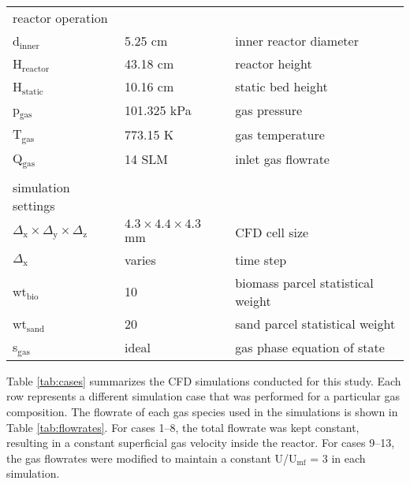 \begin{table}[H]
\begin{tabular}{lll}
        \\
        reactor operation \\
        d$_\text{inner}$      & 5.25 cm       & inner reactor diameter \\
        H$_\text{reactor}$    & 43.18 cm      & reactor height \\
        H$_\text{static}$     & 10.16 cm      & static bed height \\
        p$_\text{gas}$        & 101.325 kPa   & gas pressure \\
        T$_\text{gas}$        & 773.15 K      & gas temperature \\
        Q$_\text{gas}$        & 14 SLM        & inlet gas flowrate \\
        \\
        simulation settings \\
        $\Delta_\text{x} \times \Delta_\text{y} \times \Delta_\text{z}$ & $4.3 \times 4.4 \times 4.3$ mm & CFD cell size \\
        $\Delta_\text{x}$   & varies & time step \\
        wt$_\text{bio}$      & 10     & biomass parcel statistical weight \\
        wt$_\text{sand}$     & 20     & sand parcel statistical weight \\
        s$_\text{gas}$               & ideal  & gas phase equation of state \\
        \bottomrule
    \end{tabular}
\end{table}

Table \ref{tab:cases} summarizes the CFD simulations conducted for this study. Each row represents a different simulation case that was performed for a particular gas composition. The flowrate of each gas species used in the simulations is shown in Table \ref{tab:flowrates}. For cases 1--8, the total flowrate was kept constant, resulting in a constant superficial gas velocity inside the reactor. For cases 9--13, the gas flowrates were modified to maintain a constant U/U$_\text{mf}$ = 3 in each simulation.


